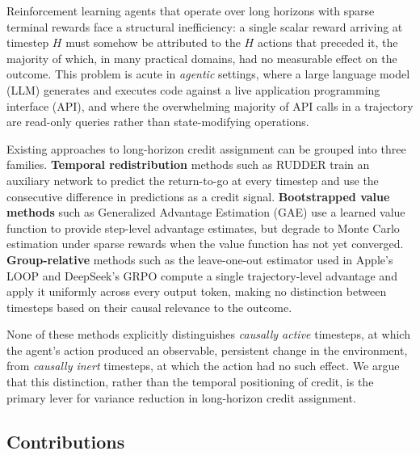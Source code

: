 \documentclass[11pt]{article}
\begin{document}
Reinforcement learning agents that operate over long horizons with sparse
terminal rewards face a structural inefficiency: a single scalar reward
arriving at timestep $H$ must somehow be attributed to the $H$ actions that
preceded it, the majority of which, in many practical domains, had no
measurable effect on the outcome. This problem is acute in \emph{agentic}
settings, where a large language model (LLM) generates and executes code
against a live application programming interface (API), and where the
overwhelming majority of API calls in a trajectory are read-only queries
rather than state-modifying operations.

Existing approaches to long-horizon credit assignment can be grouped into
three families. \textbf{Temporal redistribution} methods such as RUDDER
\cite{rudder2019} train an auxiliary network to predict the return-to-go at
every timestep and use the consecutive difference in predictions as a credit
signal. \textbf{Bootstrapped value methods} such as Generalized Advantage
Estimation (GAE) \cite{schulman2016gae} use a learned value function to
provide step-level advantage estimates, but degrade to Monte Carlo estimation
under sparse rewards when the value function has not yet converged.
\textbf{Group-relative} methods such as the leave-one-out estimator used in
Apple's LOOP \cite{loop2025} and DeepSeek's GRPO \cite{grpo2024} compute a
single trajectory-level advantage and apply it uniformly across every output
token, making no distinction between timesteps based on their causal relevance
to the outcome.

None of these methods explicitly distinguishes \emph{causally active}
timesteps, at which the agent's action produced an observable, persistent
change in the environment, from \emph{causally inert} timesteps, at which the
action had no such effect. We argue that this distinction, rather than the
temporal positioning of credit, is the primary lever for variance reduction
in long-horizon credit assignment.

\subsection{Contributions}
\end{document}
